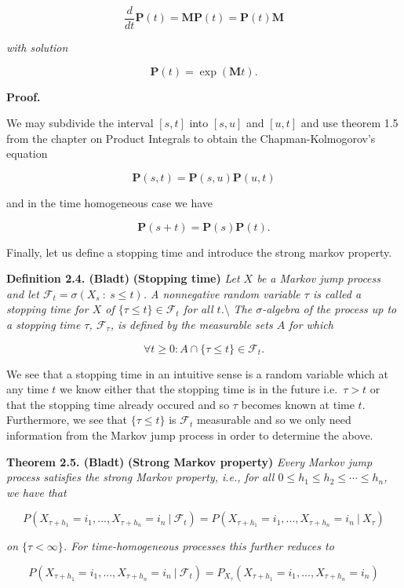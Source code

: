 \documentclass[
]{book}
\begin{document}
\[
\frac{d}{d t}\mathbf{P}(t)=\mathbf{M}\mathbf{P}(t)=\mathbf{P}(t)\mathbf{M}
\]

\emph{with solution}

\[
\mathbf{P}(t)=\exp(\mathbf{M}t).
\]

\textbf{Proof.}

We may subdivide the interval \([s,t]\) into \([s,u]\) and \([u,t]\) and use theorem 1.5 from the chapter on Product Integrals to obtain the Chapman-Kolmogorov's equation

\[
\mathbf{P}(s,t)=\mathbf{P}(s,u)\mathbf{P}(u,t)
\]

and in the time homogeneous case we have

\[
\mathbf{P}(s+t)=\mathbf{P}(s)\mathbf{P}(t).
\]

Finally, let us define a stopping time and introduce the strong markov property.

\textbf{Definition 2.4. (Bladt)} \textbf{(Stopping time)} \emph{Let \(X\) be a Markov jump process and let \(\mathcal{F}_t=\sigma(X_s\ :\ s\le t)\). A nonnegative random variable \(\tau\) is called a stopping time for \(X\) of \(\{\tau \le t\}\in\mathcal{F}_t\) for all \(t\).}\textbackslash{}
\emph{The \(\sigma\)-algebra of the process up to a stopping time \(\tau\), \(\mathcal{F}_\tau\), is defined by the measurable sets \(A\) for which}

\[
\forall t\ge 0 : A\cap \{\tau\le t\}\in\mathcal{F}_t.
\]

We see that a stopping time in an intuitive sense is a random variable which at any time \(t\) we know either that the stopping time is in the future i.e.~\(\tau > t\) or that the stopping time already occured and so \(\tau\) becomes known at time \(t\). Furthermore, we see that \(\{\tau \le t\}\) is \(\mathcal{F}_t\) measurable and so we only need information from the Markov jump process in order to determine the above.

\textbf{Theorem 2.5. (Bladt)} \textbf{(Strong Markov property)} \emph{Every Markov jump process satisfies the strong Markov property, i.e., for all \(0\le h_1\le h_2\le \cdots \le h_n\), we have that}

\[
P(X_{\tau +h_1}=i_1,...,X_{\tau + h_n}=i_n\ \vert\ \mathcal{F}_t)=P(X_{\tau +h_1}=i_1,...,X_{\tau + h_n}=i_n\ \vert\ X_\tau)
\]

\emph{on \(\{\tau <\infty\}\). For time-homogeneous processes this further reduces to}

\[
P(X_{\tau +h_1}=i_1,...,X_{\tau + h_n}=i_n\ \vert\ \mathcal{F}_t)=P_{X_\tau}(X_{\tau +h_1}=i_1,...,X_{\tau + h_n}=i_n)
\]
\end{document}
